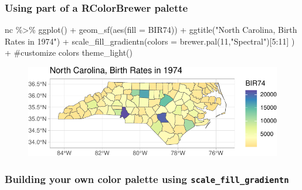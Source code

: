 \documentclass[
  letterpaper,
  DIV=11,
  numbers=noendperiod]{scrartcl}
\newenvironment{Shaded}{\begin{snugshade}}{\end{snugshade}}
\newcommand{\AttributeTok}[1]{\textcolor[rgb]{0.40,0.45,0.13}{#1}}
\newcommand{\CommentTok}[1]{\textcolor[rgb]{0.37,0.37,0.37}{#1}}
\newcommand{\DecValTok}[1]{\textcolor[rgb]{0.68,0.00,0.00}{#1}}
\newcommand{\FunctionTok}[1]{\textcolor[rgb]{0.28,0.35,0.67}{#1}}
\newcommand{\NormalTok}[1]{\textcolor[rgb]{0.00,0.23,0.31}{#1}}
\newcommand{\SpecialCharTok}[1]{\textcolor[rgb]{0.37,0.37,0.37}{#1}}
\newcommand{\StringTok}[1]{\textcolor[rgb]{0.13,0.47,0.30}{#1}}
\begin{document}
\hypertarget{using-part-of-a-rcolorbrewer-palette}{%
\subsubsection{Using part of a RColorBrewer
palette}\label{using-part-of-a-rcolorbrewer-palette}}

\begin{Shaded}
\begin{Highlighting}[]
\NormalTok{nc }\SpecialCharTok{\%\textgreater{}\%}
  \FunctionTok{ggplot}\NormalTok{() }\SpecialCharTok{+}
  \FunctionTok{geom\_sf}\NormalTok{(}\FunctionTok{aes}\NormalTok{(}\AttributeTok{fill =}\NormalTok{ BIR74)) }\SpecialCharTok{+}
  \FunctionTok{ggtitle}\NormalTok{(}\StringTok{"North Carolina, Birth Rates in 1974"}\NormalTok{) }\SpecialCharTok{+}
  \FunctionTok{scale\_fill\_gradientn}\NormalTok{(}\AttributeTok{colors =} \FunctionTok{brewer.pal}\NormalTok{(}\DecValTok{11}\NormalTok{,}\StringTok{"Spectral"}\NormalTok{)[}\DecValTok{5}\SpecialCharTok{:}\DecValTok{11}\NormalTok{] ) }\SpecialCharTok{+} \CommentTok{\#customize colors}
  \FunctionTok{theme\_light}\NormalTok{()}
\end{Highlighting}
\end{Shaded}

\begin{figure}[H]

{\centering \includegraphics{118_K_maps1_files/figure-pdf/unnamed-chunk-14-1.pdf}

}

\end{figure}

\hypertarget{building-your-own-color-palette-using-scale_fill_gradientn}{%
\subsubsection{\texorpdfstring{Building your own color palette using
\texttt{scale\_fill\_gradientn}}{Building your own color palette using scale\_fill\_gradientn}}\label{building-your-own-color-palette-using-scale_fill_gradientn}}
\end{document}
